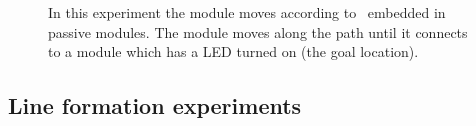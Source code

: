 \begin{figure}[h]
\begin{subfigure}[b]{0.30\linewidth}
	\end{subfigure}
	\caption{In this experiment the module moves according to \tagNamePlural~embedded in passive modules. The module moves along the path until it connects to a module which has a LED turned on (the goal location).}
	
	\label{fig:arrowExperiment}
\end{figure}

\subsection{Line formation experiments}
\label{sec:mblocksExperimentsLine}

